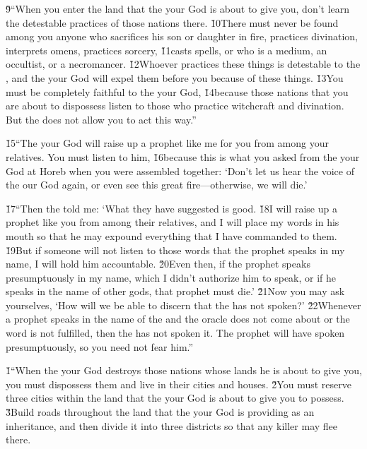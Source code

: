 \v{9}``When you enter the land that the  your God is about to give you, don't learn the detestable practices of those nations there. \v{10}There must never be found among you anyone who sacrifices his son or daughter in fire, practices divination, interprets omens, practices sorcery, \v{11}casts spells, or who is a medium, an occultist, or a necromancer. \v{12}Whoever practices these things is detestable to the , and the  your God will expel them before you because of these things. \v{13}You must be completely faithful to the  your God, \v{14}because those nations that you are about to dispossess listen to those who practice witchcraft and divination. But the  does not allow you to act this way.''

\v{15}``The  your God will raise up a prophet like me for you from among your relatives. You must listen to him, \v{16}because this is what you asked from the  your God at Horeb when you were assembled together: `Don't let us hear the voice of the  our God again, or even see this great fire---otherwise, we will die.'

\v{17}``Then the  told me: `What they have suggested is good. \v{18}I will raise up a prophet like you from among their relatives, and I will place my words in his mouth so that he may expound everything that I have commanded to them. \v{19}But if someone will not listen to those words that the prophet speaks in my name, I will hold him accountable. \v{20}Even then, if the prophet speaks presumptuously in my name, which I didn't authorize him to speak, or if he speaks in the name of other gods, that prophet must die.' \v{21}Now you may ask yourselves, `How will we be able to discern that the  has not spoken?' \v{22}Whenever a prophet speaks in the name of the  and the oracle does not come about or the word is not fulfilled, then the  has not spoken it. The prophet will have spoken presumptuously, so you need not fear him.''

\v{1}``When the  your God destroys those nations whose lands he is about to give you, you must dispossess them and live in their cities and houses. \v{2}You must reserve three cities within the land that the  your God is about to give you to possess. \v{3}Build roads throughout the land that the  your God is providing as an inheritance, and then divide it into three districts so that any killer may flee there.

